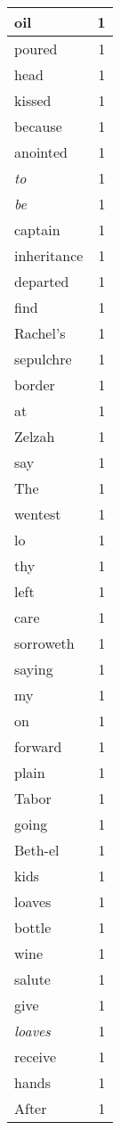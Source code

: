 \begin{center}
\begin{longtable}{l|r}
oil & 1 \\ \hline
poured & 1 \\ \hline
head & 1 \\ \hline
kissed & 1 \\ \hline
because & 1 \\ \hline
anointed & 1 \\ \hline
\emph{to} & 1 \\ \hline
\emph{be} & 1 \\ \hline
captain & 1 \\ \hline
inheritance & 1 \\ \hline
departed & 1 \\ \hline
find & 1 \\ \hline
Rachel's & 1 \\ \hline
sepulchre & 1 \\ \hline
border & 1 \\ \hline
at & 1 \\ \hline
Zelzah & 1 \\ \hline
say & 1 \\ \hline
The & 1 \\ \hline
wentest & 1 \\ \hline
lo & 1 \\ \hline
thy & 1 \\ \hline
left & 1 \\ \hline
care & 1 \\ \hline
sorroweth & 1 \\ \hline
saying & 1 \\ \hline
my & 1 \\ \hline
on & 1 \\ \hline
forward & 1 \\ \hline
plain & 1 \\ \hline
Tabor & 1 \\ \hline
going & 1 \\ \hline
Beth-el & 1 \\ \hline
kids & 1 \\ \hline
loaves & 1 \\ \hline
bottle & 1 \\ \hline
wine & 1 \\ \hline
salute & 1 \\ \hline
give & 1 \\ \hline
\emph{loaves} & 1 \\ \hline
receive & 1 \\ \hline
hands & 1 \\ \hline
After & 1 \\ \hline

\end{longtable}
\end{center}
